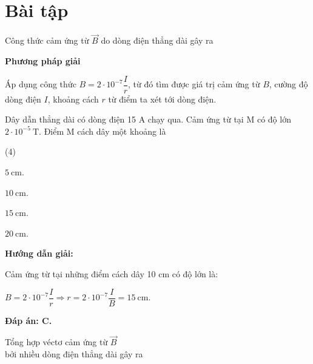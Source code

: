 \section{Bài tập}
\begin{dang}{Công thức cảm ứng từ $\vec{B}$ do dòng điện thẳng dài gây ra}
\end{dang}

\textbf{Phương pháp giải}

Áp dụng công thức  $B=2\cdot 10^{-7}\dfrac{I}{r}$, từ đó tìm được giá trị cảm ứng từ $B$, cường độ dòng điện $I$,  khoảng cách $r$ từ điểm ta xét tới dòng điện.

\vspace*{1em}

{Dây dẫn thẳng dài có dòng điện 15 A chạy qua. Cảm ứng từ tại M có độ lớn $2\cdot 10^{-5}\ \text{T}$. Điểm M cách dây một khoảng là
\begin{mcq}(4)
	\item $\text{5}\ \text{cm}$.
	\item $\text{10}\ \text{cm}$.
	\item $\text{15}\ \text{cm}$.
	\item $\text{20}\ \text{cm}$.
\end{mcq}
}
{\begin{center}
	\textbf{Hướng dẫn giải:}
\end{center}

Cảm ứng từ tại những điểm cách dây 10 cm có độ lớn là:

 $B=2\cdot 10^{-7}\dfrac{I}{r}\Rightarrow r=2\cdot 10^{-7}\dfrac{I}{B}=\text{15}\ \text{cm}$.

\textbf{Đáp án: C.}

}

\begin{dang}{Tổng hợp véctơ cảm ứng từ $\vec{B}$ \\bởi nhiều dòng điện thẳng dài gây ra}
\end{dang}

